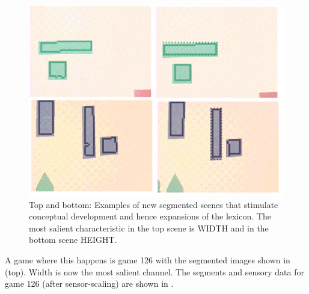 \begin{figure}
\begin{center}
\includegraphics[width=0.8\columnwidth]{chap7/figs/plate-13}
\end{center}
\caption{ Top and bottom: Examples of new segmented scenes that stimulate conceptual development
and hence expansions of the lexicon. The most salient characteristic in the top scene is WIDTH and in the bottom 
scene HEIGHT.}
\label{fig:plate-13}
\end{figure}

A game where this happens is game 126 with the segmented images
shown in  (top). Width is now the most salient
channel. The segments and sensory data for game 126 
(after sensor-scaling) are shown in . 


